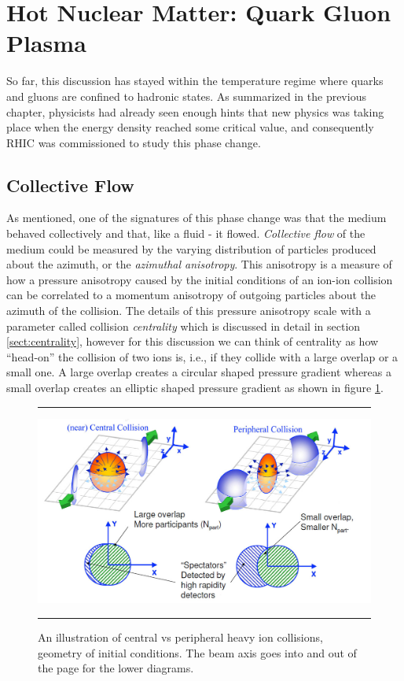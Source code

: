 \section{Hot Nuclear Matter: Quark Gluon Plasma }
So far, this discussion has stayed within the temperature regime where quarks and gluons are confined to hadronic states. As summarized in the previous chapter, physicists had already seen enough hints that new physics was taking place when the energy density reached some critical value, and consequently RHIC was commissioned to study this phase change.

\subsection{Collective Flow}
As mentioned, one of the signatures of this phase change was that the medium behaved collectively and that, like a fluid - it flowed. \textit{Collective flow} of the medium could be measured by the varying distribution of particles produced about the azimuth, or the \textit{azimuthal anisotropy}. This anisotropy is a measure of how a pressure anisotropy caused by the initial conditions of an ion-ion collision can be correlated to a momentum anisotropy of outgoing particles about the azimuth of the collision. The details of this pressure anisotropy scale with a parameter called collision \textit{centrality} which is discussed in detail in section \ref{sect:centrality}, however for this discussion we can think of centrality as how ``head-on'' the collision of two ions is, i.e., if they collide with a large overlap or a small one. A large overlap creates a circular shaped pressure gradient whereas a small overlap creates an elliptic shaped pressure gradient as shown in figure \ref{fig:centvsperiph1}.

\begin{figure}[htbp]
\centering
\rule{35em}{0.5pt}
    \includegraphics[width=1\textwidth]{Figures/centralvsperipheral.jpg}    

	\caption[Central vs Peripheral collisions, geometry of initial conditions]{An illustration of central vs peripheral heavy ion collisions, geometry of initial conditions. The beam axis goes into and out of the page for the lower diagrams.}
\label{fig:centvsperiph1}
\rule{35em}{0.5pt}
\end{figure}

